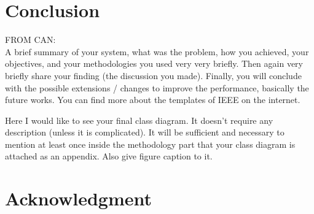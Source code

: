 \documentclass[journal]{IEEEtran}
\begin{document}
\section{Conclusion}
FROM CAN:
\\
A brief summary of your system, what was the problem, how you achieved, your objectives, and your methodologies you used very very briefly. Then again very briefly share your finding (the discussion you made). Finally, you will conclude with the possible extensions / changes to improve the performance, basically the future works. You can find more about the templates of IEEE on the internet.





Here I would like to see your final class diagram. It doesn’t require any description (unless it is complicated). It will be sufficient and necessary to mention at least once inside the methodology part that your class diagram is attached as an appendix. Also give figure caption to it.




\section*{Acknowledgment}
\end{document}

